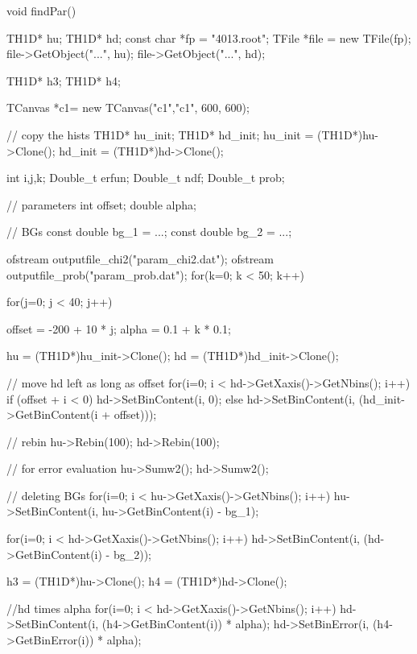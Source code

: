\documentclass[dvipdfmx]{jsarticle}
\begin{document}
\begin{mylisting}[language=c++,caption=findPar.C]
void findPar()
{
    TH1D* hu;
    TH1D* hd;
    const char *fp = "4013.root";
    TFile *file = new  TFile(fp);
    file->GetObject("...", hu);
    file->GetObject("...", hd);

    TH1D* h3;
    TH1D* h4;

    TCanvas *c1= new TCanvas("c1","c1", 600, 600);

    // copy the hists
    TH1D* hu_init;
    TH1D* hd_init;
    hu_init = (TH1D*)hu->Clone();
    hd_init = (TH1D*)hd->Clone();

    int i,j,k;
    Double_t erfun;
    Double_t ndf;
    Double_t prob;

    // parameters
    int offset;
    double alpha;

    // BGs
    const double bg_1 = ...;
    const double bg_2 = ...;

    ofstream outputfile_chi2("param_chi2.dat");
    ofstream outputfile_prob("param_prob.dat");
    for(k=0; k < 50; k++){
        for(j=0; j < 40; j++){

            offset = -200 + 10 * j;
            alpha = 0.1 + k * 0.1;

            hu = (TH1D*)hu_init->Clone();
            hd = (TH1D*)hd_init->Clone();

            // move hd left as long as offset
            for(i=0; i < hd->GetXaxis()->GetNbins(); i++){
                if (offset + i < 0){
                    hd->SetBinContent(i, 0);
                }else{
                    hd->SetBinContent(i, (hd_init->GetBinContent(i + offset)));
                }
            }

            // rebin
            hu->Rebin(100);
            hd->Rebin(100);

            // for error evaluation
            hu->Sumw2();
            hd->Sumw2();

            // deleting BGs
            for(i=0; i < hu->GetXaxis()->GetNbins(); i++){
                hu->SetBinContent(i, hu->GetBinContent(i) - bg_1);
            }

            for(i=0; i < hd->GetXaxis()->GetNbins(); i++){
                hd->SetBinContent(i, (hd->GetBinContent(i) - bg_2));
            }


            h3 = (TH1D*)hu->Clone();
            h4 = (TH1D*)hd->Clone();

            //hd times alpha
            for(i=0; i < hd->GetXaxis()->GetNbins(); i++){
                hd->SetBinContent(i, (h4->GetBinContent(i)) * alpha);
                hd->SetBinError(i, (h4->GetBinError(i)) * alpha);
            }

}}}
\end{mylisting}
\end{document}
